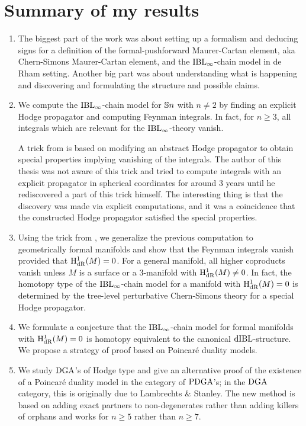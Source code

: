 \documentclass[\MainFolder/Text.tex]{subfiles}
\begin{document}
\section{Summary of my results}

\begin{enumerate}[label=\arabic*)]

\item The biggest part of the work was about setting up a formalism and deducing signs for a definition of the formal-pushforward Maurer-Cartan element, aka Chern-Simons Maurer-Cartan element, and the $\mathrm{IBL}_\infty$-chain model in de Rham setting. Another big part was about understanding what is happening and discovering and formulating the structure and possible claims.

\item We compute the $\mathrm{IBL}_\infty$-chain model for $\mathbb{S}{n}$ with $n\neq 2$ by finding an explicit Hodge propagator and computing Feynman integrals. In fact, for $n\ge 3$, all integrals which are relevant for the $\mathrm{IBL}_\infty$-theory vanish.
 
A trick from \cite{Mnev2009} is based on modifying an abstract Hodge propagator to obtain special properties implying vanishing of the integrals. The author of this thesis was not aware of this trick and tried to compute integrals with an explicit propagator in spherical coordinates for around 3 years until he rediscovered a part of this trick himself. The interesting thing is that the discovery was made via explicit computations, and it was a coincidence that the constructed Hodge propagator satisfied the special properties.
 
\item Using the trick from \cite{Mnev2009}, we generalize the previous computation to geometrically formal manifolds and show that the Feynman integrals vanish provided that $\mathrm{H}_{\mathrm{dR}}^1(M) = 0$. For a general manifold, all higher coproducts vanish unless $M$ is a surface or a $3$-manifold with $\mathrm{H}_{\mathrm{dR}}^1(M) \neq 0$. In fact, the homotopy type of the $\mathrm{IBL}_\infty$-chain model for a manifold with $\mathrm{H}_{\mathrm{dR}}^1(M) = 0$ is determined by the tree-level perturbative Chern-Simons theory for a special Hodge propagator.

\item We formulate a conjecture that the $\mathrm{IBL}_\infty$-chain model for formal manifolds with $\mathrm{H}_{\mathrm{dR}}^1(M) = 0$ is homotopy equivalent to the canonical $\mathrm{dIBL}$-structure. We propose a strategy of proof based on Poincar\'e duality models.

\item We study $\mathrm{DGA}$'s of Hodge type and give an alternative proof of the existence of a Poincar\'e duality model in the category of $\mathrm{PDGA}$'s; in the $\mathrm{DGA}$ category, this is originally due to Lambrechts \& Stanley. The new method is based on adding exact partners to non-degenerates rather than adding killers of orphans and works for $n\ge 5$ rather than $n\ge 7$.
 

\end{enumerate}
\end{document}
